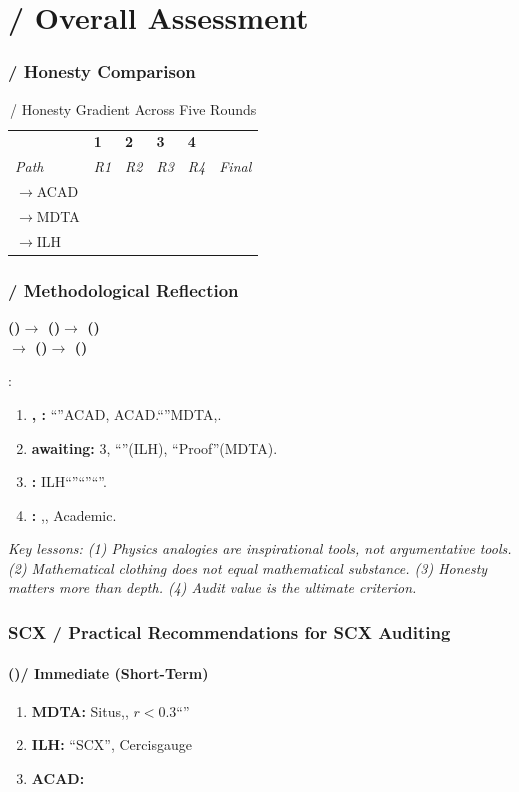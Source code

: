 \documentclass[11pt,a4paper]{article}
\theoremstyle{plain}
\theoremstyle{definition}
\theoremstyle{remark}
\begin{document}
{\part{ / Overall Assessment}
\label{part:assessment}
\section{ / Honesty Comparison}
\begin{table}[h]
\centering
\begin{tabular}{p{2.5cm} p{2.5cm} p{2.5cm} p{2.5cm} p{2.5cm} p{2cm}}
\toprule
 & \textbf{1} & \textbf{2} & \textbf{3} & \textbf{4} &  \\
\textit{Path} & \textit{R1} & \textit{R2} & \textit{R3} & \textit{R4} & \textit{Final} \\
\midrule
$\rightarrow$ACAD & & & & &  \\
$\rightarrow$MDTA & & & & &  \\
$\rightarrow$ILH & & & & &  \\
\bottomrule
\end{tabular}
\caption{ / Honesty Gradient Across Five Rounds}
\label{tab:honesty}
\end{table}
\section{ / Methodological Reflection}
\begin{center}
\textbf{()$\rightarrow$ ()$\rightarrow$ ()\\
$\rightarrow$ ()$\rightarrow$ ()}
\end{center}
\noindent : 
\begin{enumerate}[leftmargin=*]
 \item \textbf{, : } ``''ACAD, ACAD.``''MDTA,.
 \item \textbf{awaiting: } 3, ``''(ILH), ``Proof''(MDTA).
 \item \textbf{: } ILH``''``''``''.
 \item \textbf{: },, Academic.
\end{enumerate}
\textit{Key lessons: (1) Physics analogies are inspirational tools, not argumentative tools. (2) Mathematical clothing does not equal mathematical substance. (3) Honesty matters more than depth. (4) Audit value is the ultimate criterion.}
\section{SCX / Practical Recommendations for SCX Auditing}
\subsection{()/ Immediate (Short-Term)}
\begin{enumerate}[leftmargin=*]
 \item \textbf{MDTA: } Situs,, $r < 0.3$``''
 \item \textbf{ILH: } ``SCX'', Cercisgauge
 \item \textbf{ACAD: } 
\end{enumerate}
}
\end{document}
